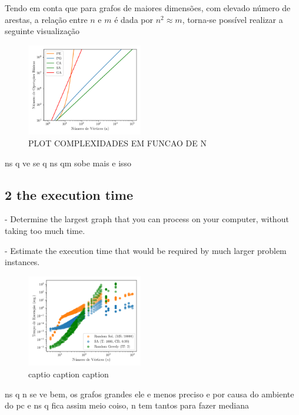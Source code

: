 \documentclass[mirror, portugues]{revdetua}
\begin{document}
Tendo em conta que para grafos de maiores dimensões, com elevado número de arestas, a relação entre $n$ e $m$ é dada por $n^2 \approx m$, torna-se possível realizar a seguinte visualização

\begin{figure}[H]
    \centering
    \includegraphics[width=0.45\textwidth]{../assets/basicops.png}
    \caption{PLOT COMPLEXIDADES EM FUNCAO DE N}
    \label{fig:total_ops_per_alg}
\end{figure}



ns q ve se q ns qm sobe mais e isso


\subsection{2 the execution time }

- Determine the largest graph that you can process on your computer, without taking too much time.

- Estimate the execution time that would be required by much larger problem instances.

\begin{figure}[H]
    \centering
    \includegraphics[width=0.45\textwidth]{../assets/time_all.png}
    \caption{captio caption caption}
    \label{fig:time_all}
\end{figure}

ns q n se ve bem, os grafos grandes ele e menos preciso e por causa do ambiente do pc e ns q fica assim meio coiso, n tem tantos para fazer mediana
\end{document}
